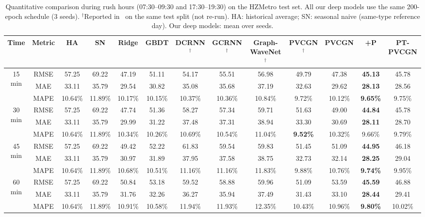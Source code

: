 \begin{table}[t]
\centering
\caption{Quantitative comparison during rush hours (07:30--09:30 and 17:30--19:30) on the HZMetro test set. All our deep models use the same 200-epoch schedule (3 seeds). $^\dagger$Reported in~\cite{liu2022pvcgn} on the same test split (not re-run). HA: historical average; SN: seasonal naive (same-type reference day). Our deep models: mean over seeds.}
\label{tab:hz-rush}
\scriptsize
\setlength{\tabcolsep}{3.2pt}
\begin{tabular}{cc|cccc|cccc|ccc}
\toprule
Time & Metric & HA & SN & Ridge & GBDT & DCRNN$^\dagger$ & GCRNN$^\dagger$ & Graph-WaveNet$^\dagger$ & PVCGN$^\dagger$ & PVCGN & +P & PT-PVCGN \\
\midrule
\multirow{3}{*}{15 min} & RMSE & 57.25 & 69.22 & 47.19 & 51.11 & 54.17 & 55.51 & 56.98 & 49.79 & 47.38 & \textbf{45.13} & 45.78 \\
 & MAE & 33.11 & 35.79 & 29.54 & 30.82 & 35.08 & 35.68 & 37.19 & 32.63 & 29.62 & \textbf{28.13} & 28.56 \\
 & MAPE & 10.64\% & 11.89\% & 10.17\% & 10.15\% & 10.37\% & 10.36\% & 10.84\% & 9.72\% & 10.12\% & \textbf{9.65\%} & 9.75\% \\
\midrule
\multirow{3}{*}{30 min} & RMSE & 57.25 & 69.22 & 47.74 & 51.36 & 58.27 & 57.34 & 59.71 & 51.63 & 49.00 & \textbf{44.84} & 45.78 \\
 & MAE & 33.11 & 35.79 & 29.99 & 31.22 & 37.48 & 37.31 & 38.94 & 33.30 & 30.69 & \textbf{28.11} & 28.70 \\
 & MAPE & 10.64\% & 11.89\% & 10.34\% & 10.26\% & 10.69\% & 10.54\% & 11.04\% & \textbf{9.52\%} & 10.32\% & 9.66\% & 9.79\% \\
\midrule
\multirow{3}{*}{45 min} & RMSE & 57.25 & 69.22 & 49.42 & 52.22 & 61.83 & 59.54 & 59.83 & 51.45 & 51.09 & \textbf{44.95} & 46.18 \\
 & MAE & 33.11 & 35.79 & 30.97 & 31.89 & 37.95 & 37.58 & 38.75 & 32.73 & 32.14 & \textbf{28.25} & 29.04 \\
 & MAPE & 10.64\% & 11.89\% & 10.68\% & 10.51\% & 11.16\% & 11.16\% & 11.83\% & 9.88\% & 10.76\% & \textbf{9.74\%} & 9.95\% \\
\midrule
\multirow{3}{*}{60 min} & RMSE & 57.25 & 69.22 & 50.84 & 53.18 & 59.52 & 58.88 & 59.96 & 51.09 & 53.59 & \textbf{45.59} & 46.88 \\
 & MAE & 33.11 & 35.79 & 31.76 & 32.26 & 36.27 & 35.94 & 37.49 & 31.43 & 33.10 & \textbf{28.44} & 29.41 \\
 & MAPE & 10.64\% & 11.89\% & 10.91\% & 10.58\% & 11.94\% & 11.93\% & 12.35\% & 10.43\% & 10.96\% & \textbf{9.80\%} & 10.02\% \\
\bottomrule
\end{tabular}
\end{table}